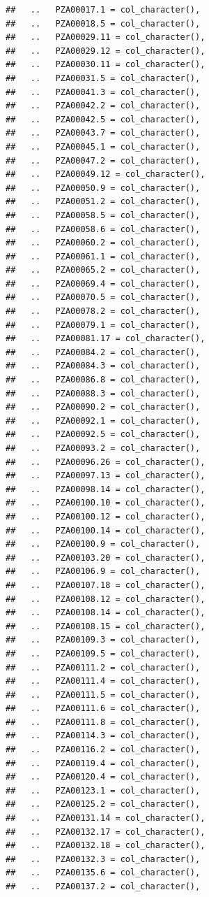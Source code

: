 \documentclass[
]{article}
\begin{document}
\begin{verbatim}
##   ..   PZA00017.1 = col_character(),
##   ..   PZA00018.5 = col_character(),
##   ..   PZA00029.11 = col_character(),
##   ..   PZA00029.12 = col_character(),
##   ..   PZA00030.11 = col_character(),
##   ..   PZA00031.5 = col_character(),
##   ..   PZA00041.3 = col_character(),
##   ..   PZA00042.2 = col_character(),
##   ..   PZA00042.5 = col_character(),
##   ..   PZA00043.7 = col_character(),
##   ..   PZA00045.1 = col_character(),
##   ..   PZA00047.2 = col_character(),
##   ..   PZA00049.12 = col_character(),
##   ..   PZA00050.9 = col_character(),
##   ..   PZA00051.2 = col_character(),
##   ..   PZA00058.5 = col_character(),
##   ..   PZA00058.6 = col_character(),
##   ..   PZA00060.2 = col_character(),
##   ..   PZA00061.1 = col_character(),
##   ..   PZA00065.2 = col_character(),
##   ..   PZA00069.4 = col_character(),
##   ..   PZA00070.5 = col_character(),
##   ..   PZA00078.2 = col_character(),
##   ..   PZA00079.1 = col_character(),
##   ..   PZA00081.17 = col_character(),
##   ..   PZA00084.2 = col_character(),
##   ..   PZA00084.3 = col_character(),
##   ..   PZA00086.8 = col_character(),
##   ..   PZA00088.3 = col_character(),
##   ..   PZA00090.2 = col_character(),
##   ..   PZA00092.1 = col_character(),
##   ..   PZA00092.5 = col_character(),
##   ..   PZA00093.2 = col_character(),
##   ..   PZA00096.26 = col_character(),
##   ..   PZA00097.13 = col_character(),
##   ..   PZA00098.14 = col_character(),
##   ..   PZA00100.10 = col_character(),
##   ..   PZA00100.12 = col_character(),
##   ..   PZA00100.14 = col_character(),
##   ..   PZA00100.9 = col_character(),
##   ..   PZA00103.20 = col_character(),
##   ..   PZA00106.9 = col_character(),
##   ..   PZA00107.18 = col_character(),
##   ..   PZA00108.12 = col_character(),
##   ..   PZA00108.14 = col_character(),
##   ..   PZA00108.15 = col_character(),
##   ..   PZA00109.3 = col_character(),
##   ..   PZA00109.5 = col_character(),
##   ..   PZA00111.2 = col_character(),
##   ..   PZA00111.4 = col_character(),
##   ..   PZA00111.5 = col_character(),
##   ..   PZA00111.6 = col_character(),
##   ..   PZA00111.8 = col_character(),
##   ..   PZA00114.3 = col_character(),
##   ..   PZA00116.2 = col_character(),
##   ..   PZA00119.4 = col_character(),
##   ..   PZA00120.4 = col_character(),
##   ..   PZA00123.1 = col_character(),
##   ..   PZA00125.2 = col_character(),
##   ..   PZA00131.14 = col_character(),
##   ..   PZA00132.17 = col_character(),
##   ..   PZA00132.18 = col_character(),
##   ..   PZA00132.3 = col_character(),
##   ..   PZA00135.6 = col_character(),
##   ..   PZA00137.2 = col_character(),

\end{verbatim}
\end{document}

